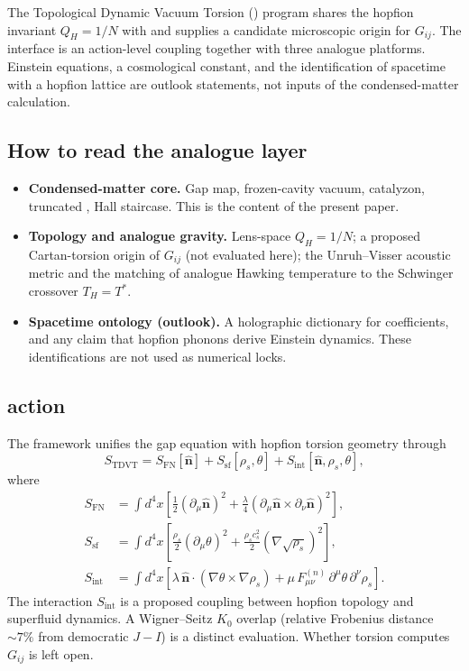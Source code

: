 \documentclass[11pt,letterpaper]{article}
\begin{document}
The Topological Dynamic Vacuum Torsion (\TDVT) program shares the hopfion invariant $Q_H=1/N$ with \QVC{} and supplies a candidate microscopic origin for $G_{ij}$. The interface is an action-level coupling together with three analogue platforms. Einstein equations, a cosmological constant, and the identification of spacetime with a hopfion lattice are outlook statements, not inputs of the condensed-matter calculation.

\subsection{How to read the analogue layer}

\begin{itemize}
\item \textbf{Condensed-matter core.} Gap map, frozen-cavity vacuum, catalyzon, truncated \TQGL{}, Hall staircase. This is the content of the present paper.
\item \textbf{Topology and analogue gravity.} Lens-space $Q_H=1/N$; a proposed Cartan-torsion origin of $G_{ij}$ (not evaluated here); the Unruh--Visser acoustic metric and the matching of analogue Hawking temperature to the Schwinger crossover $T_H=T^*$.
\item \textbf{Spacetime ontology (outlook).} A holographic dictionary for \TQGL{} coefficients, and any claim that hopfion phonons derive Einstein dynamics. These identifications are not used as numerical locks.
\end{itemize}

\subsection{\TDVT{} action}

The \TDVT{} framework unifies the \QVC{} gap equation with hopfion torsion geometry through
\begin{equation}
S_{\text{TDVT}} = S_{\text{FN}}[\hat{\mathbf{n}}] + S_{\text{sf}}[\rho_s, \theta] + S_{\text{int}}[\hat{\mathbf{n}}, \rho_s, \theta],
\end{equation}
where
\begin{align}
S_{\text{FN}} &= \int d^4x \left[\frac{1}{2}(\partial_\mu \hat{\mathbf{n}})^2 + \frac{\lambda}{4}(\partial_\mu \hat{\mathbf{n}} \times \partial_\nu \hat{\mathbf{n}})^2\right], \\
S_{\text{sf}} &= \int d^4x \left[\frac{\rho_s}{2}(\partial_\mu\theta)^2 + \frac{\rho_s c_s^2}{2}(\nabla\sqrt{\rho_s})^2\right], \\
S_{\text{int}} &= \int d^4x \left[\lambda\, \hat{\mathbf{n}} \cdot (\nabla\theta \times \nabla\rho_s) + \mu\, F^{(n)}_{\mu\nu}\, \partial^\mu\theta\, \partial^\nu\rho_s\right].
\end{align}
The interaction $S_{\text{int}}$ is a proposed coupling between hopfion topology and superfluid dynamics. A Wigner--Seitz $K_0$ overlap (relative Frobenius distance $\sim 7\%$ from democratic $J-I$) is a distinct evaluation. Whether torsion computes $G_{ij}$ is left open.
\end{document}
